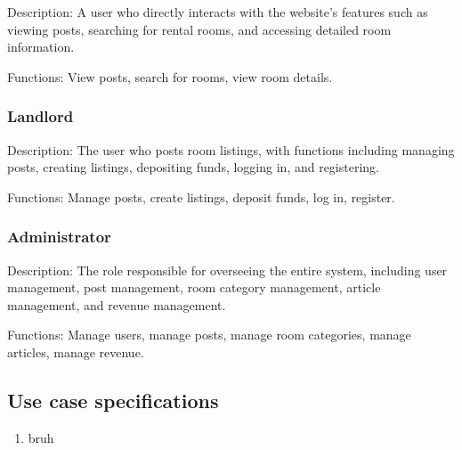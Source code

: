\documentclass[../Main.tex]{subfiles}
\begin{document}
Description: A user who directly interacts with the website's features such as viewing posts, searching for rental rooms, and accessing detailed room information.

Functions: View posts, search for rooms, view room details.

\subsubsection{Landlord}
Description: The user who posts room listings, with functions including managing posts, creating listings, depositing funds, logging in, and registering.

Functions: Manage posts, create listings, deposit funds, log in, register.

\subsubsection{Administrator}

Description: The role responsible for overseeing the entire system, including user management, post management, room category management, article management, and revenue management.

Functions: Manage users, manage posts, manage room categories, manage articles, manage revenue.

\subsection{Use case specifications}

\begin{enumerate}
    \item bruh
\end{enumerate}
\end{document}
